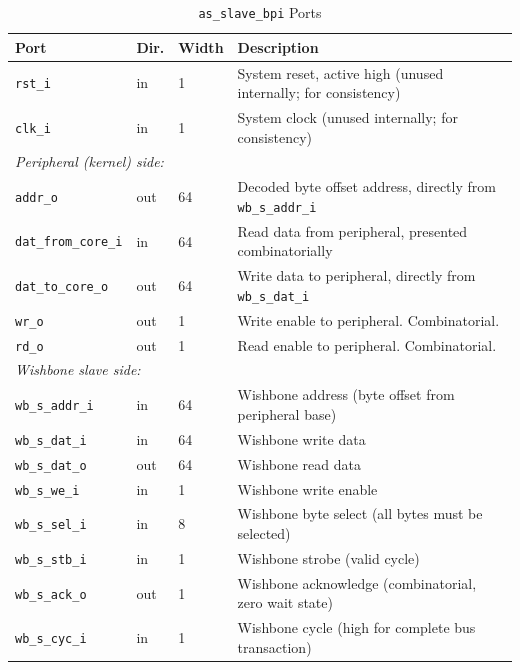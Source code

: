 \begin{table}[H]
\caption{\texttt{as\_slave\_bpi} Ports}
\label{tab:asQspiPer05}
\centering
\begin{tabularx}{\textwidth}{|l|l|l|X|}
  \hline
  Port & Dir. & Width & Description \\
  \hline\hline
  \texttt{rst\_i}             & in  & 1  & System reset, active high (unused internally; for consistency) \\
  \hline
  \texttt{clk\_i}             & in  & 1  & System clock (unused internally; for consistency) \\
  \hline
  \multicolumn{4}{|l|}{\textit{Peripheral (kernel) side:}} \\
  \hline
  \texttt{addr\_o}            & out & 64 & Decoded byte offset address, directly from \texttt{wb\_s\_addr\_i} \\
  \hline
  \texttt{dat\_from\_core\_i} & in  & 64 & Read data from peripheral, presented combinatorially \\
  \hline
  \texttt{dat\_to\_core\_o}   & out & 64 & Write data to peripheral, directly from \texttt{wb\_s\_dat\_i} \\
  \hline
  \texttt{wr\_o}              & out & 1  & Write enable to peripheral. Combinatorial. \\
  \hline
  \texttt{rd\_o}              & out & 1  & Read enable to peripheral. Combinatorial. \\
  \hline
  \multicolumn{4}{|l|}{\textit{Wishbone slave side:}} \\
  \hline
  \texttt{wb\_s\_addr\_i}     & in  & 64 & Wishbone address (byte offset from peripheral base) \\
  \hline
  \texttt{wb\_s\_dat\_i}      & in  & 64 & Wishbone write data \\
  \hline
  \texttt{wb\_s\_dat\_o}      & out & 64 & Wishbone read data \\
  \hline
  \texttt{wb\_s\_we\_i}       & in  & 1  & Wishbone write enable \\
  \hline
  \texttt{wb\_s\_sel\_i}      & in  & 8  & Wishbone byte select (all bytes must be selected) \\
  \hline
  \texttt{wb\_s\_stb\_i}      & in  & 1  & Wishbone strobe (valid cycle) \\
  \hline
  \texttt{wb\_s\_ack\_o}      & out & 1  & Wishbone acknowledge (combinatorial, zero wait state) \\
  \hline
  \texttt{wb\_s\_cyc\_i}      & in  & 1  & Wishbone cycle (high for complete bus transaction) \\
  \hline
\end{tabularx}
\end{table}

